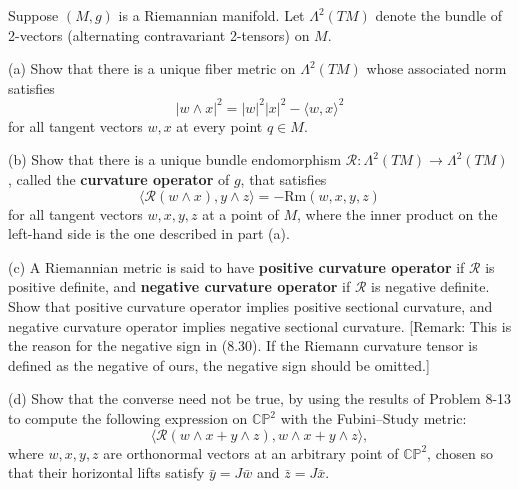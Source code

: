 \begin{exercise}
\label{prob:curvature-operator}
Suppose $(M, g)$ is a Riemannian manifold. Let $\Lambda^2(TM)$ denote the bundle of 2-vectors (alternating contravariant 2-tensors) on $M$.

(a) Show that there is a unique fiber metric on $\Lambda^2(TM)$ whose associated norm satisfies
\[
|w \wedge x|^2 = |w|^2|x|^2 - \langle w,x\rangle^2
\]
for all tangent vectors $w, x$ at every point $q \in M$.

(b) Show that there is a unique bundle endomorphism $\mathcal{R}: \Lambda^2(TM) \to \Lambda^2(TM)$, called the \textbf{curvature operator} of $g$, that satisfies
\begin{equation}
\langle \mathcal{R}(w \wedge x), y \wedge z\rangle = -\text{Rm}(w,x,y,z)
\tag{8.30}
\end{equation}
for all tangent vectors $w, x, y, z$ at a point of $M$, where the inner product on the left-hand side is the one described in part (a).

(c) A Riemannian metric is said to have \textbf{positive curvature operator} if $\mathcal{R}$ is positive definite, and \textbf{negative curvature operator} if $\mathcal{R}$ is negative definite. Show that positive curvature operator implies positive sectional curvature, and negative curvature operator implies negative sectional curvature. [Remark: This is the reason for the negative sign in (8.30). If the Riemann curvature tensor is defined as the negative of ours, the negative sign should be omitted.]

(d) Show that the converse need not be true, by using the results of Problem 8-13 to compute the following expression on $\mathbb{CP}^2$ with the Fubini--Study metric:
\[
\langle \mathcal{R}(w \wedge x + y \wedge z), w \wedge x + y \wedge z\rangle,
\]
where $w, x, y, z$ are orthonormal vectors at an arbitrary point of $\mathbb{CP}^2$, chosen so that their horizontal lifts satisfy $\bar{y} = J\bar{w}$ and $\bar{z} = J\bar{x}$.
\end{exercise}
